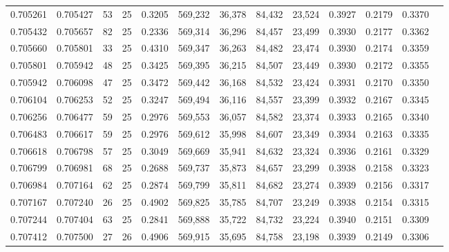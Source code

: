 \begin{tabular}{rrrrrrrrrrrrr}
0.705261 & 0.705427 &    53 &  25 &                                     0.3205 & 569,232 &  36,378 &  84,432 &  23,524 & 0.3927 & 0.2179 & 0.3370 \\
0.705432 & 0.705657 &    82 &  25 &                                     0.2336 & 569,314 &  36,296 &  84,457 &  23,499 & 0.3930 & 0.2177 & 0.3362 \\
0.705660 & 0.705801 &    33 &  25 &                                     0.4310 & 569,347 &  36,263 &  84,482 &  23,474 & 0.3930 & 0.2174 & 0.3359 \\
0.705801 & 0.705942 &    48 &  25 &                                     0.3425 & 569,395 &  36,215 &  84,507 &  23,449 & 0.3930 & 0.2172 & 0.3355 \\
0.705942 & 0.706098 &    47 &  25 &                                     0.3472 & 569,442 &  36,168 &  84,532 &  23,424 & 0.3931 & 0.2170 & 0.3350 \\
0.706104 & 0.706253 &    52 &  25 &                                     0.3247 & 569,494 &  36,116 &  84,557 &  23,399 & 0.3932 & 0.2167 & 0.3345 \\
0.706256 & 0.706477 &    59 &  25 &                                     0.2976 & 569,553 &  36,057 &  84,582 &  23,374 & 0.3933 & 0.2165 & 0.3340 \\
0.706483 & 0.706617 &    59 &  25 &                                     0.2976 & 569,612 &  35,998 &  84,607 &  23,349 & 0.3934 & 0.2163 & 0.3335 \\
0.706618 & 0.706798 &    57 &  25 &                                     0.3049 & 569,669 &  35,941 &  84,632 &  23,324 & 0.3936 & 0.2161 & 0.3329 \\
0.706799 & 0.706981 &    68 &  25 &                                     0.2688 & 569,737 &  35,873 &  84,657 &  23,299 & 0.3938 & 0.2158 & 0.3323 \\
0.706984 & 0.707164 &    62 &  25 &                                     0.2874 & 569,799 &  35,811 &  84,682 &  23,274 & 0.3939 & 0.2156 & 0.3317 \\
0.707167 & 0.707240 &    26 &  25 &                                     0.4902 & 569,825 &  35,785 &  84,707 &  23,249 & 0.3938 & 0.2154 & 0.3315 \\
0.707244 & 0.707404 &    63 &  25 &                                     0.2841 & 569,888 &  35,722 &  84,732 &  23,224 & 0.3940 & 0.2151 & 0.3309 \\
0.707412 & 0.707500 &    27 &  26 &                                     0.4906 & 569,915 &  35,695 &  84,758 &  23,198 & 0.3939 & 0.2149 & 0.3306 \\

\end{tabular}
